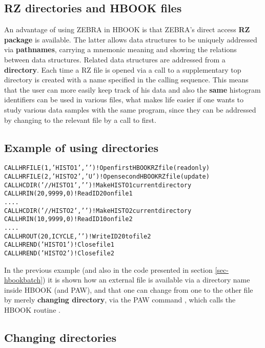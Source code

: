 \subsection{RZ directories and HBOOK files}

An advantage of using ZEBRA in HBOOK is that ZEBRA's direct
access {\bf RZ package} is available.
The latter allows data structures to
be uniquely addressed via {\bf pathnames}, carrying a mnemonic meaning and
showing the relations between data structures. Related data structures are
addressed from a {\bf directory}. Each time a RZ file is opened via a
call to  a supplementary top directory is created with
a name specified in the calling sequence. This
means that the user can more easily keep track of his data
and also the {\bf same} histogram identifiers can be used
in various files, what makes life easier if one wants to study various
data samples with the same program,
since they can be addressed by changing
to the relevant file by a call to  first.

\subsection*{Example of using directories}
\begin{alltt}
     CALL HRFILE(1,'HISTO1',' ')    ! Open first  HBOOK RZ file (read only)
     CALL HRFILE(2,'HISTO2','U')    ! Open second HBOOK RZ file (update)
     CALL HCDIR('//HISTO1',' ')     ! Make HISTO1 current directory
     CALL HRIN(20,9999,0)           ! Read ID 20 on file 1
       ....
     CALL HCDIR('//HISTO2',' ')     ! Make HISTO2 current directory
     CALL HRIN(10,9999,0)           ! Read ID 10 on file 2
       ....
     CALL HROUT(20,ICYCLE,' ')      ! Write ID 20 to file 2
     CALL HREND('HISTO1')           ! Close file 1
     CALL HREND('HISTO2')           ! Close file 2
\end{alltt}

In the previous example (and also in the code presented in section
\ref{sec-hbookbatch}) it is shown how an external file is available
via a directory name inside HBOOK (and PAW), and that one can change
from one to the other file by merely {\bf changing directory}, via the
PAW command , which calls the HBOOK routine .

\subsection{Changing directories}

